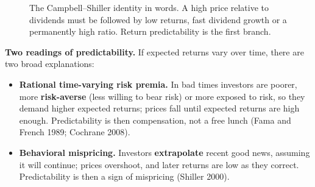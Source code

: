 \begin{figure}[!htbp]
  \centering
  \caption{The Campbell--Shiller identity in words. A high price relative to
    dividends must be followed by low returns, fast dividend growth or a
    permanently high ratio. Return predictability is the first branch.}
  \label{fig:07-identity}
\end{figure}

\textbf{Two readings of predictability.} If expected returns vary over time, there are two broad explanations:

\begin{itemize}
  \item \textbf{Rational time-varying risk premia.} In bad times investors are poorer, more \textbf{risk-averse} (less willing to bear risk) or more exposed to risk, so they demand higher expected returns; prices fall until expected returns are high enough. Predictability is then compensation, not a free lunch (Fama and French 1989; Cochrane 2008).
  \item \textbf{Behavioral mispricing.} Investors \textbf{extrapolate} recent good news, assuming it will continue; prices overshoot, and later returns are low as they correct. Predictability is then a sign of mispricing (Shiller 2000).
\end{itemize}

